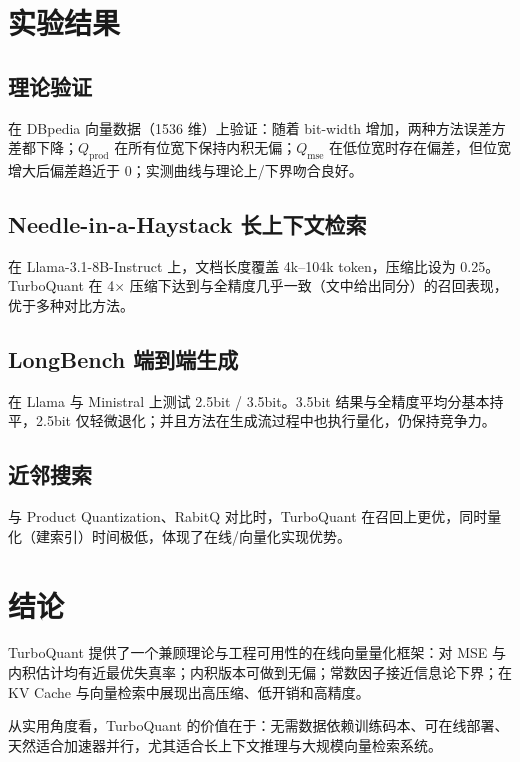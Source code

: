 \documentclass[11pt]{ctexart}
\begin{document}
\section{实验结果}
\subsection{理论验证}
在 DBpedia 向量数据（1536 维）上验证：随着 bit-width 增加，两种方法误差方差都下降；$Q_{\text{prod}}$ 在所有位宽下保持内积无偏；$Q_{\text{mse}}$ 在低位宽时存在偏差，但位宽增大后偏差趋近于 0；实测曲线与理论上/下界吻合良好。

\subsection{Needle-in-a-Haystack 长上下文检索}
在 Llama-3.1-8B-Instruct 上，文档长度覆盖 4k--104k token，压缩比设为 0.25。TurboQuant 在 4$\times$ 压缩下达到与全精度几乎一致（文中给出同分）的召回表现，优于多种对比方法。

\subsection{LongBench 端到端生成}
在 Llama 与 Ministral 上测试 2.5bit / 3.5bit。3.5bit 结果与全精度平均分基本持平，2.5bit 仅轻微退化；并且方法在生成流过程中也执行量化，仍保持竞争力。

\subsection{近邻搜索}
与 Product Quantization、RabitQ 对比时，TurboQuant 在召回上更优，同时量化（建索引）时间极低，体现了在线/向量化实现优势。

\section{结论}
TurboQuant 提供了一个兼顾理论与工程可用性的在线向量量化框架：对 MSE 与内积估计均有近最优失真率；内积版本可做到无偏；常数因子接近信息论下界；在 KV Cache 与向量检索中展现出高压缩、低开销和高精度。

从实用角度看，TurboQuant 的价值在于：无需数据依赖训练码本、可在线部署、天然适合加速器并行，尤其适合长上下文推理与大规模向量检索系统。
\end{document}
